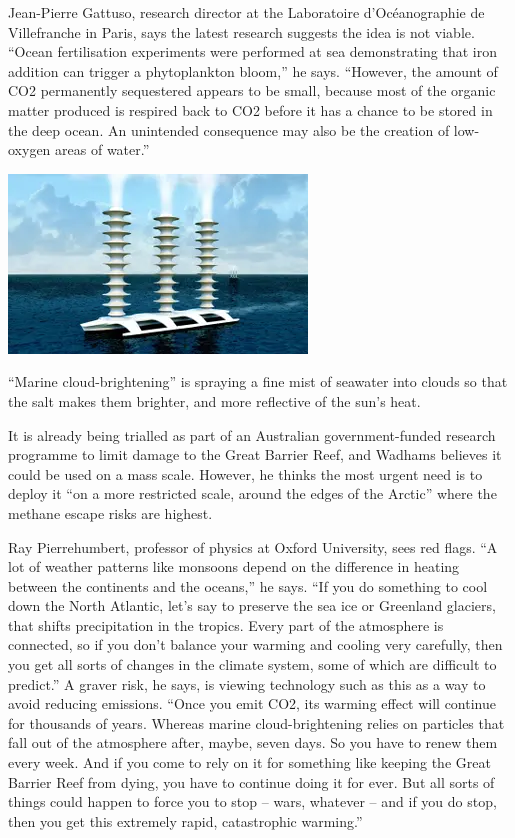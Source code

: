 \documentclass[
]{book}
\begin{document}
Jean-Pierre Gattuso, research director at the Laboratoire d'Océanographie de Villefranche in Paris, says the latest research suggests the idea is not viable. ``Ocean fertilisation experiments were performed at sea demonstrating that iron addition can trigger a phytoplankton bloom,'' he says. ``However, the amount of CO2 permanently sequestered appears to be small, because most of the organic matter produced is respired back to CO2 before it has a chance to be stored in the deep ocean. An unintended consequence may also be the creation of low-oxygen areas of water.''

\includegraphics{fig/seawater_spraying_ship.png}

``Marine cloud-brightening'' is spraying a fine mist of seawater into clouds so that the salt makes them brighter, and more reflective of the sun's heat.

It is already being trialled as part of an Australian government-funded research programme to limit damage to the Great Barrier Reef, and Wadhams believes it could be used on a mass scale. However, he thinks the most urgent need is to deploy it ``on a more restricted scale, around the edges of the Arctic'' where the methane escape risks are highest.

Ray Pierrehumbert, professor of physics at Oxford University, sees red flags.
``A lot of weather patterns like monsoons depend on the difference in heating between the continents and the oceans,'' he says. ``If you do something to cool down the North Atlantic, let's say to preserve the sea ice or Greenland glaciers, that shifts precipitation in the tropics. Every part of the atmosphere is connected, so if you don't balance your warming and cooling very carefully, then you get all sorts of changes in the climate system, some of which are difficult to predict.''
A graver risk, he says, is viewing technology such as this as a way to avoid reducing emissions. ``Once you emit CO2, its warming effect will continue for thousands of years. Whereas marine cloud-brightening relies on particles that fall out of the atmosphere after, maybe, seven days. So you have to renew them every week. And if you come to rely on it for something like keeping the Great Barrier Reef from dying, you have to continue doing it for ever. But all sorts of things could happen to force you to stop -- wars, whatever -- and if you do stop, then you get this extremely rapid, catastrophic warming.''
\end{document}
